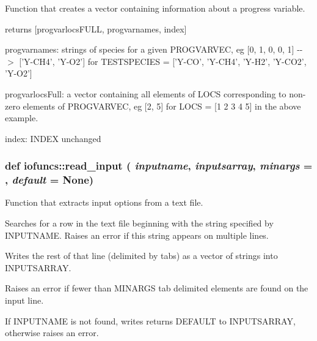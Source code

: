 Function that creates a vector containing information about a progress variable. 

returns \mbox{[}progvarlocsFULL, progvarnames, index\mbox{]}

progvarnames: strings of species for a given PROGVARVEC, eg \mbox{[}0, 1, 0, 0, 1\mbox{]} -\/-\/$>$ \mbox{[}'Y-\/CH4', 'Y-\/O2'\mbox{]} for TESTSPECIES = \mbox{[}'Y-\/CO', 'Y-\/CH4', 'Y-\/H2', 'Y-\/CO2', 'Y-\/O2'\mbox{]}

progvarlocsFull: a vector containing all elements of LOCS corresponding to non-\/zero elements of PROGVARVEC, eg \mbox{[}2, 5\mbox{]} for LOCS = \mbox{[}1 2 3 4 5\mbox{]} in the above example.

index: INDEX unchanged \hypertarget{namespaceiofuncs_afcd921653dd1ba4c990aac881b097a51}{
\subsubsection[{read\_\-input}]{\setlength{\rightskip}{0pt plus 5cm}def iofuncs::read\_\-input ( {\em inputname}, \/   {\em inputsarray}, \/   {\em minargs} = {}, \/   {\em default} = {\ttfamily None})}}
\label{d7/dcd/namespaceiofuncs_afcd921653dd1ba4c990aac881b097a51}


Function that extracts input options from a text file. 

Searches for a row in the text file beginning with the string specified by INPUTNAME. Raises an error if this string appears on multiple lines.

Writes the rest of that line (delimited by tabs) as a vector of strings into INPUTSARRAY.

Raises an error if fewer than MINARGS tab delimited elements are found on the input line.

If INPUTNAME is not found, writes returns DEFAULT to INPUTSARRAY, otherwise raises an error. 